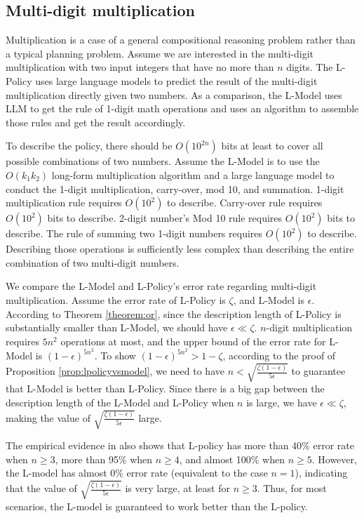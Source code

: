 \subsection{Multi-digit multiplication}\label{app-sec:multiplication}


Multiplication is a case of a general compositional reasoning problem rather than a typical planning problem. Assume we are interested in the multi-digit multiplication with two input integers that have no more than $n$ digits. The L-Policy uses large language models to predict the result of the multi-digit multiplication directly given two numbers. As a comparison, the L-Model uses LLM to get the rule of 1-digit math operations and uses an algorithm to assemble those rules and get the result accordingly. 

To describe the policy, there should be $O(10^{2n})$ bits at least to cover all possible combinations of two numbers. 
Assume the L-Model is to use the $O(k_1k_2)$ long-form multiplication algorithm and a large language model to conduct the 1-digit multiplication, carry-over, mod 10, and summation. 1-digit multiplication rule requires $O(10^2)$ to describe. Carry-over rule requires $O(10^2)$ bits to describe. 2-digit number's Mod 10 rule requires $O(10^2)$ bits to describe. The rule of summing two 1-digit numbers requires $O(10^2)$ to describe. Describing those operations is sufficiently less complex than describing the entire combination of two multi-digit numbers. 

We compare the L-Model and L-Policy's error rate regarding multi-digit multiplication. Assume the error rate of L-Policy is $\zeta$, and L-Model is $\epsilon$. According to Theorem \ref{theorem:or}, since the description length of L-Policy is substantially smaller than L-Model, we should have $\epsilon\ll \zeta$. $n$-digit multiplication requires $5n^2$ operations at most, and the upper bound of the error rate for L-Model is $(1-\epsilon)^{5n^2}$. To show $(1-\epsilon)^{5n^2} > 1-\zeta$, according to the proof of Proposition \ref{prop:lpolicyvsmodel}, we need to have $n <\sqrt{\frac{\zeta(1-\epsilon)}{5\epsilon}}$ to guarantee that L-Model is better than L-Policy. Since there is a big gap between the description length of the L-Model and L-Policy when $n$ is large, we have $\epsilon \ll \zeta$, making the value of $\sqrt{\frac{\zeta(1-\epsilon)}{5\epsilon}}$ large. 

The empirical evidence in \cite{dziri2023faith} also shows that L-policy has more than 40\% error rate when $n\geq 3$, more than 95\% when $n\geq 4$, and almost 100\% when $n\geq 5$. However, the L-model has almost 0\% error rate (equivalent to the case $n=1$), indicating that the value of $\sqrt{\frac{\zeta(1-\epsilon)}{5\epsilon}}$ is very large, at least for $n\geq 3$. Thus, for most scenarios, the L-model is guaranteed to work better than the L-policy. 

